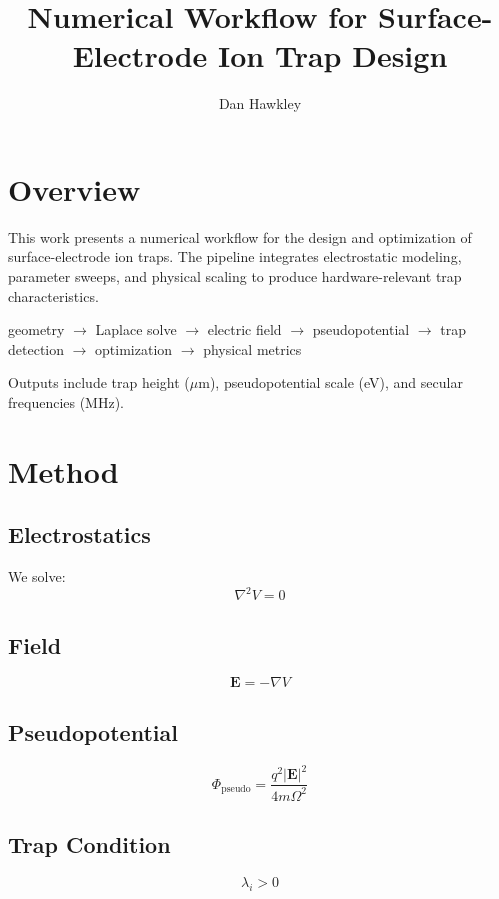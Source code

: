 \documentclass[11pt]{article}
\title{Numerical Workflow for Surface-Electrode Ion Trap Design}
\author{Dan Hawkley}
\date{}
\begin{document}
\maketitle

\section*{Overview}

This work presents a numerical workflow for the design and optimization of surface-electrode ion traps. The pipeline integrates electrostatic modeling, parameter sweeps, and physical scaling to produce hardware-relevant trap characteristics.

\begin{center}
geometry $\rightarrow$ Laplace solve $\rightarrow$ electric field $\rightarrow$ pseudopotential $\rightarrow$ trap detection $\rightarrow$ optimization $\rightarrow$ physical metrics
\end{center}

Outputs include trap height ($\mu$m), pseudopotential scale (eV), and secular frequencies (MHz).

\section*{Method}

\subsection*{Electrostatics}

We solve:
\[
\nabla^2 V = 0
\]

\subsection*{Field}

\[
\mathbf{E} = -\nabla V
\]

\subsection*{Pseudopotential}

\[
\Phi_{\mathrm{pseudo}} = \frac{q^2 |\mathbf{E}|^2}{4 m \Omega^2}
\]

\subsection*{Trap Condition}

\[
\lambda_i > 0
\]
\end{document}
